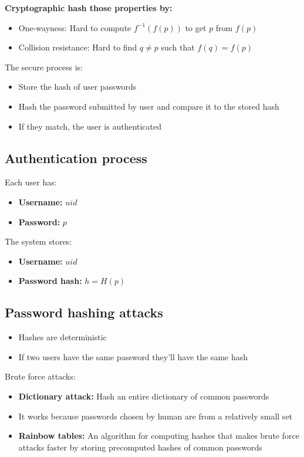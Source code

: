 \documentclass[12pt,a4paper]{article}
\begin{document}
\noindent \textbf{Cryptographic hash those properties by:}
\begin{itemize}
    \item One-wayness: Hard to compute $f^{-1}(f(p))$ to get $p$ from $f(p)$
    \item Collision resistance: Hard to find $q \neq p$ such that $f(q) = f(p)$
\end{itemize}

\noindent The secure process is:
\begin{itemize}
    \item Store the hash of user passwords 
    \item Hash the password submitted by user and compare it to the stored hash
    \item If they match, the user is authenticated
\end{itemize}

\subsection{Authentication process}
Each user has:
\begin{itemize}
    \item \textbf{Username:} $uid$
    \item \textbf{Password:} $p$
\end{itemize}

\noindent The system stores:
\begin{itemize}
    \item \textbf{Username:} $uid$
    \item \textbf{Password hash:} $h = H(p)$
\end{itemize}

\subsection{Password hashing attacks}
\begin{itemize}
    \item Hashes are deterministic 
    \item If two users have the same password they'll have the same hash
\end{itemize}

\noindent Brute force attacks:
\begin{itemize}
    \item \textbf{Dictionary attack:} Hash an entire dictionary of common passwords
    \item It works because passwords chosen by human are from a relatively small set
    \item \textbf{Rainbow tables:} An algorithm for computing hashes that makes brute force attacks faster by storing precomputed hashes of common passwords
\end{itemize}
\end{document}
